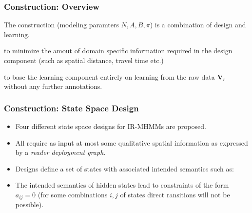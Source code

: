 
\begin{frame}
\frametitle{Construction: Overview}

The construction (modeling paramters $N, A, B, \pi$) is a combination of design and learning.
\begin{fitemize}
  \item to minimize the amout of domain specific information required in the design component (such as spatial distance, travel time etc.)
  \item to base the learning component entirely on learning from the raw data $\mathbf{V}_r$ without any further annotations.
\end{fitemize}

\begin{block}{}
\end{block}

\end{frame}


\begin{frame}
\frametitle{Construction: State Space Design}

\begin{itemize}
  \item Four different state space designs for IR-MHMMs are proposed.
  \item All require as input at most some qualitative spatial information as expressed by a \emph{reader deployment graph}.
  \item Designs define a set of states with associated intended semantics such as:
  \item The intended semantics of hidden states lead to constraints of the form $a_{ij} = 0$ (for some combinations $i,j$ of states direct ransitions will not be possible).
\end{itemize}

\end{frame}

